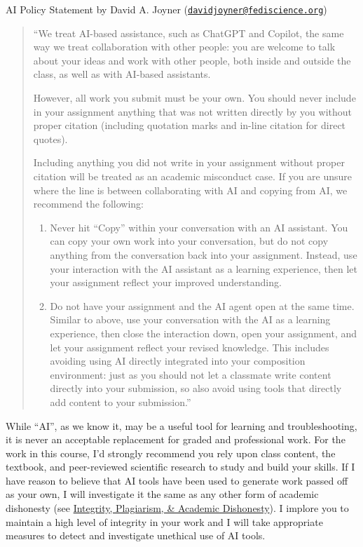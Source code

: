 \documentclass[
  12pt,
  letterpaper,
]{scrartcl}
\begin{document}
AI Policy Statement by David A. Joyner
(\href{mailto:davidjoyner@fediscience.org}{\nolinkurl{davidjoyner@fediscience.org}})

\begin{quote}
``We treat AI-based assistance, such as ChatGPT and Copilot, the same
way we treat collaboration with other people: you are welcome to talk
about your ideas and work with other people, both inside and outside the
class, as well as with AI-based assistants.

However, all work you submit must be your own. You should never include
in your assignment anything that was not written directly by you without
proper citation (including quotation marks and in-line citation for
direct quotes).

Including anything you did not write in your assignment without proper
citation will be treated as an academic misconduct case. If you are
unsure where the line is between collaborating with AI and copying from
AI, we recommend the following:

\begin{enumerate}
\def\labelenumi{\arabic{enumi}.}
\item
  Never hit ``Copy'' within your conversation with an AI assistant. You
  can copy your own work into your conversation, but do not copy
  anything from the conversation back into your assignment. Instead, use
  your interaction with the AI assistant as a learning experience, then
  let your assignment reflect your improved understanding.
\item
  Do not have your assignment and the AI agent open at the same time.
  Similar to above, use your conversation with the AI as a learning
  experience, then close the interaction down, open your assignment, and
  let your assignment reflect your revised knowledge. This includes
  avoiding using AI directly integrated into your composition
  environment: just as you should not let a classmate write content
  directly into your submission, so also avoid using tools that directly
  add content to your submission.''
\end{enumerate}
\end{quote}

While ``AI'', as we know it, may be a useful tool for learning and
troubleshooting, it is never an acceptable replacement for graded and
professional work. For the work in this course, I'd strongly recommend
you rely upon class content, the textbook, and peer-reviewed scientific
research to study and build your skills. If I have reason to believe
that AI tools have been used to generate work passed off as your own, I
will investigate it the same as any other form of academic dishonesty
(see \hyperref[integrity-plagiarism-academic-dishonesty]{Integrity,
Plagiarism, \& Academic Dishonesty}). I implore you to maintain a high
level of integrity in your work and I will take appropriate measures to
detect and investigate unethical use of AI tools.
\end{document}
